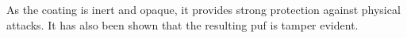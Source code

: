 As the coating is inert and opaque, it provides strong protection against physical attacks. It has also been shown that the resulting \gls{puf} is tamper evident.~\cite{Tuyls2006}




